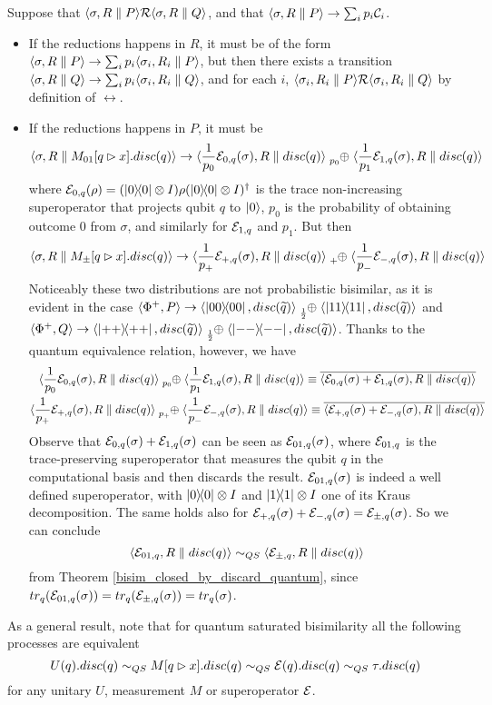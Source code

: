Suppose that $\langle\sigma, R \parallel P\rangle \mathcal{R} \langle\sigma, R \parallel Q\rangle$, and that $\langle\sigma, R \parallel P\rangle \rightarrow \sum_i p_i \mathcal{C}_i$.\begin{itemize}
\item If the reductions happens in $R$, it must be of the form $\langle\sigma, R \parallel P\rangle \rightarrow \sum_i p_i \langle\sigma_i, R_i \parallel P\rangle$, but then there exists a transition $\langle\sigma, R \parallel Q\rangle \rightarrow \sum_i p_i \langle\sigma_i, R_i \parallel Q\rangle$, and for each $i$, $\langle\sigma_i, R_i \parallel P\rangle \mathcal{R} \langle\sigma_i, R_i \parallel Q\rangle$ by definition of $\rel$.
\item If the reductions happens in $P$, it must be 
 \[\confw{\sigma, R \parallel M_{01}[q \rhd x].disc(q)} \rightarrow \confw{\frac{1}{p_0}\sop_{0, q}(\sigma), R \parallel disc(q)} \psum{p_0} \confw{\frac{1}{p_1}\sop_{1, q}(\sigma), R \parallel disc(q)}\]
 where $\mathcal{E}_{0, q}(\rho) = (\ket{0}\!\!\bra{0}\otimes I) \rho (\ket{0}\!\!\bra{0} \otimes I)^\dagger$ is the trace non-increasing superoperator that projects qubit $q$ to $\ket{0}$, $p_0$ is the probability of obtaining outcome $0$ from $\sigma$, and similarly for $\mathcal{E}_{1, q }$ and $p_1$. But then  
 \[\confw{\sigma, R \parallel M_\pm[q \rhd x].disc(q)} \rightarrow \confw{\frac{1}{p_+}\sop_{+, q}(\sigma), R \parallel disc(q)} \psum{+} \confw{\frac{1}{p_-}\sop_{-, q}(\sigma), R \parallel disc(q)}
 \] 
 Noticeably these two distributions are not probabilistic bisimilar, as it is evident in the case $\confw{\Phi^+, P} \rightarrow \confw{\proj{00}, \discQ} \psum{\frac{1}{2}} \confw{\proj{11}, \discQ}$ and $\confw{\Phi^+, Q} \rightarrow \confw{\proj{++}, \discQ} \psum{\frac{1}{2}} \confw{\proj{--}, \discQ}$.  Thanks to the quantum equivalence relation, however, we have 
 \begin{gather*}
 \confw{\frac{1}{p_0}\sop_{0, q}(\sigma), R \parallel disc(q)} \psum{p_0} \confw{\frac{1}{p_1}\sop_{1, q}(\sigma), R \parallel disc(q)} \equiv \overline{\confw{\sop_{0, q}(\sigma) + \sop_{1, q}(\sigma), R \parallel disc(q)}}
 \\
 \confw{\frac{1}{p_+}\sop_{+, q}(\sigma), R \parallel disc(q)} \psum{p_+} \confw{\frac{1}{p_-}\sop_{-, q}(\sigma), R \parallel disc(q)} \equiv \overline{\confw{\sop_{+, q}(\sigma) + \sop_{-, q}(\sigma), R \parallel disc(q)}}
 \end{gather*}
 Observe that $\mathcal{E}_{0, q}(\sigma) + \mathcal{E}_{1, q}(\sigma)$ can be seen as $\mathcal{E}_{01, q}(\sigma)$, where $\mathcal{E}_{01, q}$ is the trace-preserving superoperator that measures the qubit $q$ in the computational basis and then discards the result. $\mathcal{E}_{01, q}(\sigma)$ is indeed a well defined superoperator, with $\ket{0}\!\!\bra{0}\otimes I$ and $\ket{1}\!\!\bra{1}\otimes I$ one of its Kraus decomposition. The same holds also for $\mathcal{E}_{+, q}(\sigma) + \mathcal{E}_{-, q}(\sigma) = \mathcal{E}_{\pm, q}(\sigma)$. So we can conclude
 \[ \langle\mathcal{E}_{01,q},  R \parallel disc(q)\rangle \sim_{QS} \langle\mathcal{E}_{\pm,q},  R \parallel disc(q)\rangle
 \]
 from Theorem \ref{bisim_closed_by_discard_quantum}, since $tr_q(\mathcal{E}_{01, q}(\sigma)) = tr_q(\mathcal{E}_{\pm, q}(\sigma)) = tr_q(\sigma)$.
\end{itemize}
\begin{remark}
As a general result, note that for quantum saturated bisimilarity all the following processes are equivalent 
\[	U(q).disc(q) \sim_{QS} M[q \rhd x].disc(q) \sim_{QS} \mathcal{E}(q).disc(q) \sim_{QS} \tau.disc(q) \]
for any unitary $U$, measurement $M$ or superoperator $\mathcal{E}$.
\end{remark}

